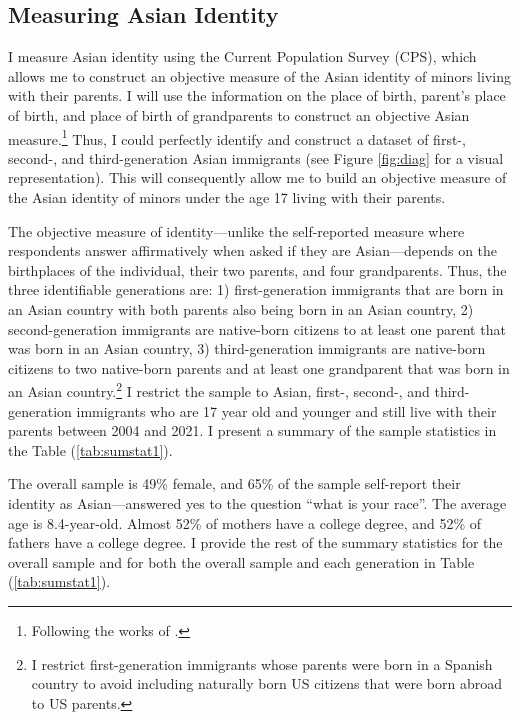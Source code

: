 \subsection{Measuring Asian Identity}\label{subsec:cps}

I measure Asian identity using the Current Population Survey (CPS), which allows me to construct an objective measure of the Asian identity of minors living with their parents. I will use the information on the place of birth, parent's place of birth, and place of birth of grandparents to construct an objective Asian measure.\footnote{Following the works of \textcite{antmanEthnicAttritionObserved2016,antmanEthnicAttritionAssimilation2020}.} Thus, I could perfectly identify and construct a dataset of first-, second-, and third-generation Asian immigrants (see Figure \ref{fig:diag} for a visual representation). This will consequently allow me to build an objective measure of the Asian identity of minors under the age 17 living with their parents. 

The objective measure of identity---unlike the self-reported measure where respondents answer affirmatively when asked if they are Asian---depends on the birthplaces of the individual, their two parents, and four grandparents. Thus, the three identifiable generations are: 1) first-generation immigrants that are born in an Asian country with both parents also being born in an Asian country, 2) second-generation immigrants are native-born citizens to at least one parent that was born in an Asian country, 3) third-generation immigrants are native-born citizens to two native-born parents and at least one grandparent that was born in an Asian country.\footnote{I restrict first-generation immigrants whose parents were born in a Spanish country to avoid including naturally born US citizens that were born abroad to US parents.} I restrict the sample to Asian, first-, second-, and third-generation immigrants who are 17 year old and younger and still live with their parents between 2004 and 2021. I present a summary of the sample statistics in the Table (\ref{tab:sumstat1}). 

The overall sample is 49\% female, and 65\% of the sample self-report their identity as Asian---answered yes to the question ``what is your race''. The average age is 8.4-year-old. Almost 52\% of mothers have a college degree, and 52\% of fathers have a college degree. I provide the rest of the summary statistics for the overall sample and for both the overall sample and each generation in Table (\ref{tab:sumstat1}). 

